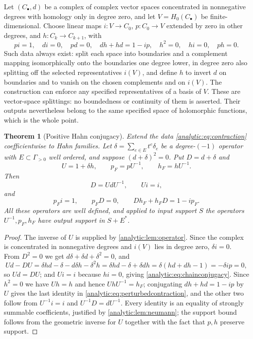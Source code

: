 \documentclass[11pt,letterpaper]{article}
\newtheorem{theorem}{Theorem}[section]
\theoremstyle{definition}
\theoremstyle{remark}
\numberwithin{equation}{section}
\begin{document}
Let $(C_\bullet,d)$ be a complex of complex vector spaces concentrated in
nonnegative degrees with homology only in degree zero, and let
$V=H_0(C_\bullet)$ be finite-dimensional. Choose linear maps
$i:V\to C_0$, $p:C_0\to V$ extended by zero in other degrees, and
$h:C_k\to C_{k+1}$, with
\begin{equation}\label{analytic:eq:contraction}
 pi=1,\quad di=0,\quad pd=0,\quad dh+hd=1-ip,\quad
 h^2=0,\quad hi=0,\quad ph=0 .
\end{equation}
Such data always exist: split each space into boundaries and a complement
mapping isomorphically onto the boundaries one degree lower, in degree zero
also splitting off the selected representatives $i(V)$, and define $h$ to
invert $d$ on boundaries and to vanish on the chosen complements and on
$i(V)$. The construction can enforce any specified representatives of a
basis of $V$. These are vector-space splittings: no boundedness or
continuity of them is asserted. Their outputs nevertheless belong to the
same specified space of holomorphic functions, which is the whole point.

\begin{theorem}[Positive Hahn conjugacy]\label{analytic:thm:conjugacy}
Extend the data \eqref{analytic:eq:contraction} coefficientwise to Hahn
families. Let $\delta=\sum_{e\in E}t^e\delta_e$ be a degree-$(-1)$ operator
with $E\subset\Gamma_{>0}$ well ordered, and suppose $(d+\delta)^2=0$. Put
$D=d+\delta$ and
\begin{equation}\label{analytic:eq:perturbedmaps}
 U=1+\delta h,\qquad p_F=pU^{-1},\qquad h_F=hU^{-1}.
\end{equation}
Then
\begin{equation}\label{analytic:eq:chainconjugacy}
 D=UdU^{-1},\qquad Ui=i,
\end{equation}
and
\begin{equation}\label{analytic:eq:perturbedcontraction}
 p_Fi=1,\qquad p_FD=0,\qquad Dh_F+h_FD=1-ip_F .
\end{equation}
All these operators are well defined, and applied to input support $S$ the
operators $U^{-1},p_F,h_F$ have output support in $S+E^*$.
\end{theorem}
\begin{proof}
The inverse of $U$ is supplied by \cref{analytic:lem:operator}. Since the
complex is concentrated in nonnegative degrees and $i(V)$ lies in degree
zero, $\delta i=0$. From $D^2=0$ we get $d\delta+\delta d+\delta^2=0$, and
\[
 Ud-DU=\delta hd-\delta-d\delta h-\delta^2h
 =\delta hd-\delta+\delta dh=\delta(hd+dh-1)=-\delta ip=0 ,
\]
so $Ud=DU$; and $Ui=i$ because $hi=0$, giving
\eqref{analytic:eq:chainconjugacy}. Since $h^2=0$ we have $Uh=h$ and hence
$UhU^{-1}=h_F$; conjugating $dh+hd=1-ip$ by $U$ gives the last identity in
\eqref{analytic:eq:perturbedcontraction}, and the other two follow from
$U^{-1}i=i$ and $U^{-1}D=dU^{-1}$. Every identity is an equality of
strongly summable coefficients, justified by
\cref{analytic:lem:neumann}; the support bound follows from the geometric
inverse for $U$ together with the fact that $p,h$ preserve support.
\end{proof}
\end{document}
